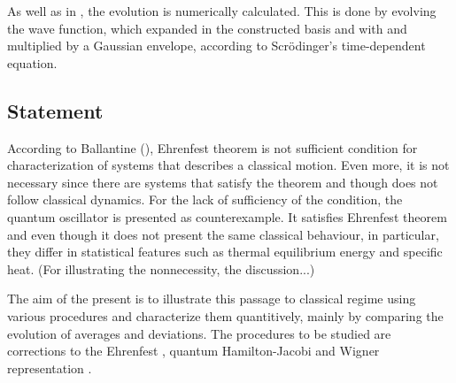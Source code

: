 As well as in \cite{manfrediQuantumSystemsThat1993}, the evolution is numerically calculated. This is done by evolving the wave function, which expanded in the constructed basis and with and multiplied by a Gaussian envelope, according to Scrödinger’s time-dependent equation.

\subsection*{Statement}

According to Ballantine (\cite{ballentineInadequacyEhrenfestTheorem1994,ballentineQuantumMechanicsModern2010}), Ehrenfest theorem is not sufficient condition for characterization of systems that describes a classical motion. Even more, it is not necessary since there are systems that satisfy the theorem and though does not follow classical dynamics. For the lack of sufficiency of the condition, the quantum oscillator is presented as counterexample. It satisfies Ehrenfest theorem and even though it does not present the same classical behaviour, in particular, they differ in statistical features such as thermal equilibrium energy and specific heat. (For illustrating the nonnecessity, the discussion...)

The aim of the present is to illustrate this passage to classical regime using various procedures and characterize them quantitively, mainly by comparing the evolution of averages and deviations. The procedures to be studied are corrections to the Ehrenfest , quantum Hamilton-Jacobi  and Wigner representation . 